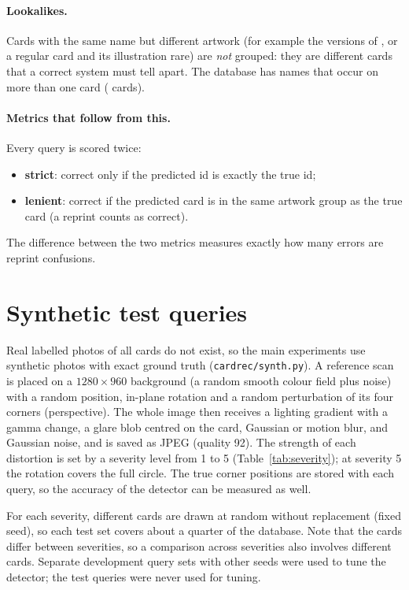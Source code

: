 \paragraph{Lookalikes.} Cards with the same name but different artwork (for example the  versions of \emph{}, or a regular card and its illustration rare) are \emph{not} grouped: they are different cards that a correct system must tell apart. The database has  names that occur on more than one card ( cards).

\paragraph{Metrics that follow from this.} Every query is scored twice:
\begin{itemize}
  \item \textbf{strict}: correct only if the predicted id is exactly the true id;
  \item \textbf{lenient}: correct if the predicted card is in the same artwork group as the true card (a reprint counts as correct).
\end{itemize}
The difference between the two metrics measures exactly how many errors are reprint confusions.

\section{Synthetic test queries}
\label{sec:synthetic}

Real labelled photos of all  cards do not exist, so the main experiments use synthetic photos with exact ground truth (\texttt{cardrec/synth.py}). A reference scan is placed on a $1280\times960$ background (a random smooth colour field plus noise) with a random position, in-plane rotation and a random perturbation of its four corners (perspective). The whole image then receives a lighting gradient with a gamma change, a glare blob centred on the card, Gaussian or motion blur, and Gaussian noise, and is saved as JPEG (quality 92). The strength of each distortion is set by a severity level from 1 to 5 (Table~\ref{tab:severity}); at severity 5 the rotation covers the full circle. The true corner positions are stored with each query, so the accuracy of the detector can be measured as well.



For each severity,  different cards are drawn at random without replacement (fixed seed), so each test set covers about a quarter of the database. Note that the cards differ between severities, so a comparison across severities also involves different cards. Separate development query sets with other seeds were used to tune the detector; the test queries were never used for tuning.

